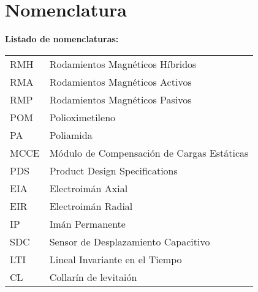 \chapter{Nomenclatura}

\textbf{Listado de nomenclaturas:}\\


\begin{tabular}{ll}
	RMH\hspace{3cm} & Rodamientos Magn\'eticos H\'ibridos\\
	RMA\hspace{3cm} & Rodamientos Magn\'eticos Activos\\
	RMP\hspace{3cm} & Rodamientos Magn\'eticos Pasivos\\
	POM\hspace{3cm} & Polioximetileno \\
	PA\hspace{3cm} & Poliamida\\
	MCCE\hspace{3cm} & M\'odulo de Compensaci\'on de Cargas Est\'aticas\\
	PDS\hspace{3cm} & Product Design Specifications\\ 
	EIA\hspace{3cm} & Electroim\'an Axial\\
	EIR\hspace{3cm} & Electroim\'an Radial\\
	IP\hspace{3cm} & Im\'an Permanente\\
	SDC\hspace{3cm} & Sensor de Desplazamiento Capacitivo\\
	LTI\hspace{3cm} & Lineal Invariante en el Tiempo\\
	CL\hspace{3cm} & Collar\'in de levitai\'on
\end{tabular}

